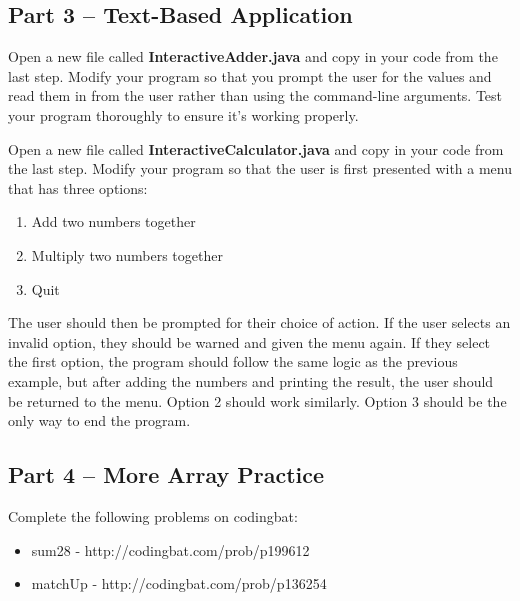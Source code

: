 \initialbox
\subsection{Part 3 -- Text-Based Application}

\begin{exer}
Open a new file called \textbf{InteractiveAdder.java} and copy in your code from the last step. Modify your program so that you prompt the user for the values and read them in from the user rather than using the command-line arguments. Test your program thoroughly to ensure it's working properly. 
\end{exer}


\begin{exer}
Open a new file called \textbf{InteractiveCalculator.java} and copy in your code from the last step. Modify your program so that the user is first presented with a menu that has three options:

\begin{enumerate}
\item Add two numbers together
\item Multiply two numbers together
\item Quit
\end{enumerate}

The user should then be prompted for their choice of action. If the user selects an invalid option, they should be warned and given the menu again. If they select the first option, the program should follow the same logic as the previous example, but after adding the numbers and printing the result, the user should be returned to the menu. Option 2 should work similarly. Option 3 should be the only way to end the program.
\end{exer}


\initialbox
\subsection{Part 4 -- More Array Practice}
Complete the following problems on codingbat:

\begin{itemize}
\item sum28 - http://codingbat.com/prob/p199612
\item matchUp - http://codingbat.com/prob/p136254
\end{itemize}

\initialbox
